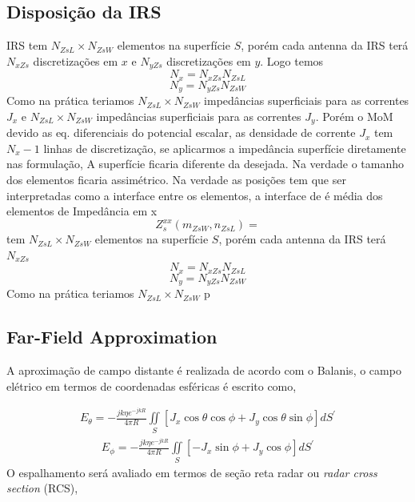 \documentclass[
	12pt,				%
	openright,			%
	oneside,			%
	a4papey79r,			%
	english,			%
	brazil				%
	]{abntex2}
\begin{document}
 \subsection{Disposição da IRS}
IRS tem $N_{ZsL} \times N_{ZsW}$ elementos na superfície $S$, porém cada antenna da IRS terá $N_{xZs}$ discretizações em $x$ e $N_{yZs}$ discretizações em $y$.  Logo temos
\begin{equation}
    N_{x}=N_{xZs}N_{ZsL}
\end{equation}
\begin{equation}
    N_{y}=N_{yZs}N_{ZsW}
\end{equation}
 Como na prática teriamos $N_{ZsL} \times N_{ZsW}$ impedâncias superficiais para as correntes $J_x$ e  $N_{ZsL} \times N_{ZsW}$ impedâncias superficiais para as correntes $J_y$.
Porém o MoM devido as eq. diferenciais do potencial escalar, as densidade de corrente $J_x$ tem $N_{x}-1$ linhas de discretização, se aplicarmos a impedância superfície diretamente nas formulação, A superfície ficaria diferente da desejada. Na verdade o tamanho dos elementos ficaria assimétrico. Na verdade as posições tem que ser interpretadas como a interface entre os elementos, a interface de é média dos elementos de Impedância em x 
 \begin{equation}
     Z^{xx}_{s}(m_{ZsW},n_{ZsL})=
 \end{equation} tem $N_{ZsL} \times N_{ZsW}$ elementos na superfície $S$, porém cada antenna da IRS terá $N_{xZs}$
\begin{equation}
    N_{x}=N_{xZs}N_{ZsL}
\end{equation}
\begin{equation}
    N_{y}=N_{yZs}N_{ZsW}
\end{equation}
 Como na prática teriamos $N_{ZsL} \times N_{ZsW}$  p
\subsection{Far-Field Approximation}

A aproximação de campo distante é realizada de acordo com o Balanis, o campo elétrico em termos de coordenadas esféricas é escrito como,


 \begin{equation}
\begin{aligned}
E_{\theta}=-\frac{jk \eta e^{-j kR}}{4\pi R} 
  \iint \limits_S [J_x \cos{\theta} \cos{\phi}+J_y \cos{\theta} \sin{\phi}] dS^{'}
   \end{aligned}
\end{equation}
 \begin{equation}
\begin{aligned}
E_{\phi}=-\frac{jk\eta e^{-jkR}}{4\pi R} 
  \iint \limits_S [-J_x  \sin{\phi} +J_y \cos{\phi} ] dS^{'}
   \end{aligned}
\end{equation}
O espalhamento será avaliado em termos de seção reta radar ou \emph{radar cross section} (RCS), 
\end{document}
